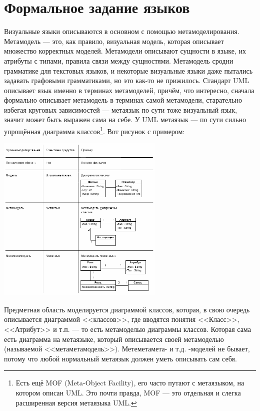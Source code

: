 \documentclass{text-style}
\begin{document}

\section{Формальное задание языков}

Визуальные языки описываются в основном с помощью метамоделирования. Метамодель --- это, как правило, визуальная модель, которая описывает множество корректных моделей. Метамодели описывают сущности в языке, их атрибуты с типами, правила связи между сущностями. Метамодель сродни грамматике для текстовых языков, и некоторые визуальные языки даже пытались задавать графовыми грамматиками, но это как-то не прижилось. Стандарт UML описывает язык именно в терминах метамоделей, причём, что интересно, сначала формально описывает метамодель в терминах самой метамодели, старательно избегая круговых зависимостей --- метаязык по сути тоже визуальный язык, значит может быть выражен сама на себе. У UML метаязык --- по сути сильно упрощённая диаграмма классов\footnote{Есть ещё MOF (Meta-Object Facility), его часто путают с метаязыком, на котором описан UML. Это почти правда, MOF --- это отдельная и слегка расширенная версия метаязыка UML.}. Вот рисунок с примером:


\begin{center}
    \includegraphics[width=0.6\textwidth]{metalevels-ru.png}
\end{center}

Предметная область моделируется диаграммой классов, которая, в свою очередь описывается диаграммой <<классов>>, где вводятся понятия <<Класс>>, <<Атрибут>> и т.п. --- то есть метамоделью диаграммы классов. Которая сама есть диаграмма на метаязыке, который описывается своей метамоделью (называемой <<метаметамодель>>). Метеметамета- и т.д. -моделей не бывает, потому что любой нормальный метаязык должен уметь описывать сам себя.
\end{document}
